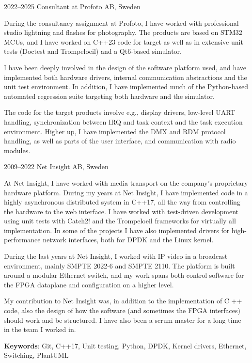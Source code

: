 \documentclass[a4paper]{article}
\begin{document}
\begin{CV}
\item[2022--2025] Consultant at Profoto AB, Sweden

During the consultancy assignment at Profoto, I have worked with professional studio lightning
and flashes for photography. The products are based on STM32 MCUs, and I have worked on C++23
code for target as well as in extensive unit tests (Doctest and Trompeloeil) and a Qt6-based
simulator.

I have been deeply involved in the design of the software platform used, and have implemented
both hardware drivers, internal communication abstractions and the unit test environment. In
addition, I have implemented much of the Python-based automated regression suite targeting
both hardware and the simulator.

The code for the target products involve e.g., display drivers, low-level UART handling,
synchronization between IRQ and task context and the task execution environment. Higher up,
I have implemented the DMX and RDM protocol handling, as well as parts of the user
interface, and communication with radio modules.

\item[2009--2022] Net Insight AB, Sweden
  
At Net Insight, I have worked with media transport on the company's proprietary hardware
platform. During my years at Net Insight, I have implemented code in a highly asynchronous
distributed system in C++17, all the way from controlling the hardware to the web interface.
I have worked with test-driven development using unit tests with Catch2! and the Trompeloeil
frameworks for virtually all implementation. In some of the projects I have also implemented
drivers for high-performance network interfaces, both for DPDK and the Linux kernel.

During the last years at Net Insight, I worked with IP video in a broadcast environment,
mainly SMPTE 2022-6 and SMPTE 2110. The platform is built around a modular Ethernet switch,
and my work spans both control software for the FPGA dataplane and configuration on a higher
level.

My contribution to Net Insight was, in addition to the implementation of C ++ code, also the
design of how the software (and sometimes the FPGA interfaces) should work and be structured.
I have also been a scrum master for a long time in the team I worked in.

\textbf{Keywords}: Git, C++17, Unit testing, Python, DPDK, Kernel drivers, Ethernet, Switching, PlantUML


\end{CV}
\end{document}
